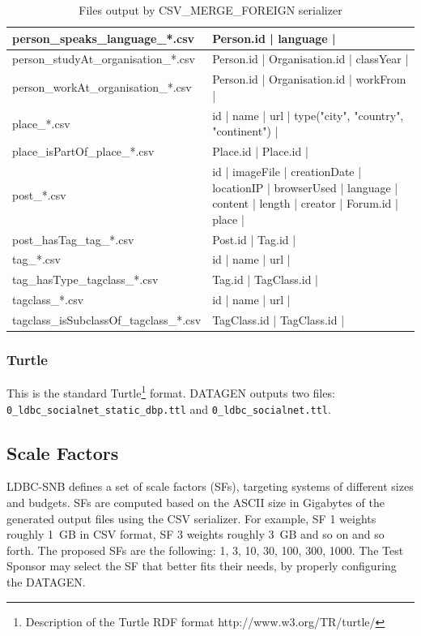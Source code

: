 \begin{table}[htbp]
{\begin{minipage}[c]{\textheight}
\begin{tabular}{|p{5cm}|p{19cm}|}
            \hline
            person\_speaks\_language\_*.csv & Person.id | language |\\
            \hline
            person\_studyAt\_organisation\_*.csv & Person.id | Organisation.id | classYear |\\
            \hline
            person\_workAt\_organisation\_*.csv &  Person.id | Organisation.id | workFrom |\\
            \hline
            place\_*.csv & id | name | url | type({"city", "country", "continent"}) |\\
            \hline
            place\_isPartOf\_place\_*.csv & Place.id | Place.id |\\
            \hline
            post\_*.csv & id | imageFile | creationDate | locationIP | browserUsed | language | content | length | creator | Forum.id | place |\\
            \hline
            post\_hasTag\_tag\_*.csv & Post.id | Tag.id |\\
            \hline
            tag\_*.csv & id | name | url | \\
            \hline
            tag\_hasType\_tagclass\_*.csv & Tag.id | TagClass.id |\\
            \hline
            tagclass\_*.csv & id | name | url | \\
            \hline
            tagclass\_isSubclassOf\_tagclass\_*.csv & TagClass.id | TagClass.id |\\
            \hline
        \end{tabular}
        \caption{Files output by CSV\_MERGE\_FOREIGN serializer}
        \label{table:csv_merge_foreign}
	\end{minipage}
}
\end{table}


\subsubsection{Turtle}

This is the standard Turtle\footnote{Description of
the Turtle RDF format http://www.w3.org/TR/turtle/} format. DATAGEN outputs
two files: \texttt{0\_ldbc\_socialnet\_static\_dbp.ttl} and \texttt{0\_ldbc\_socialnet.ttl}.

\subsection{Scale Factors}

LDBC-SNB defines a set of scale factors (SFs), targeting systems of different
sizes and budgets.  SFs are computed based on the ASCII size in Gigabytes of
the generated output files using the CSV serializer. For example, SF 1 weights roughly 1~GB in CSV
format, SF 3 weights roughly 3~GB and so on and so forth.  The proposed SFs are
the following: 1, 3, 10, 30, 100, 300, 1000. The Test Sponsor may select the SF
that better fits their needs, by properly configuring the DATAGEN.

